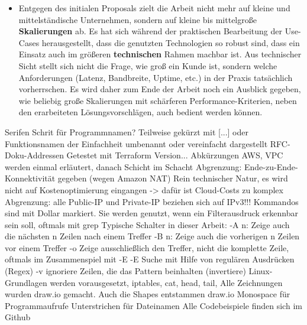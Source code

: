 \begin{itemize}
\item Entgegen des initialen Proposals zielt die Arbeit nicht mehr auf kleine und mittelständische Unternehmen, sondern auf kleine bis mittelgroße \textbf{Skalierungen} ab. Es hat sich während der praktischen Bearbeitung der Use-Cases herausgestellt, dass die genutzten Technologien so robust sind, dass ein Einsatz auch im \glqq größeren \textbf{technischen} Rahmen\grqq{} machbar ist. Aus technischer Sicht stellt sich nicht die Frage, wie \glqq groß\grqq{} ein Kunde ist, sondern welche Anforderungen (Latenz, Bandbreite, Uptime, etc.) in der Praxis tatsächlich vorherrschen. Es wird daher zum Ende der Arbeit noch ein Ausblick gegeben, wie beliebig große Skalierungen mit schärferen Performance-Kriterien, neben den erarbeiteten Lösungsvorschlägen, auch bedient werden können. 


\end{itemize}

\ifFalse
Serifen Schrit für Programmnamen?
Teilweise gekürzt mit [...] oder Funktionsnamen der Einfachheit umbenannt oder vereinfacht dargestellt
RFC-Doku-Addressen
Getestet mit Terraform Version...
Abkürzungen AWS, VPC werden einmal erläutert, danach Schicht im Schacht
Abgrenzung: Ende-zu-Ende-Konnektivität gegeben (wegen Amazon NAT)
Rein technischer Natur, es wird nicht auf Kostenoptimierung eingangen -> dafür ist Cloud-Costs zu komplex
Abgrenzung: alle Public-IP und Private-IP beziehen sich auf IPv3!!!
Kommandos sind mit Dollar markiert. Sie werden genutzt, wenn ein Filterausdruck erkennbar sein soll, oftmals mit grep
Typische Schalter in dieser Arbeit:
-A n: Zeige auch die nächsten n Zeilen nach einem Treffer
-B n: Zeige auch die vorherigen n Zeilen vor einem Treffer
-o Zeige ausschließlich den Treffer, nicht die komplette Zeile, oftmals im Zusammenspiel mit -E
-E Suche mit Hilfe von regulären Ausdrücken (Regex)
-v ignoriere Zeilen, die das Pattern beinhalten (invertiere)
Linux-Grundlagen werden vorausgesetzt, iptables, cat, head, tail, 
Alle Zeichnungen wurden draw.io gemacht. Auch die Shapes entstammen draw.io
Monospace für Programmaufrufe
Unterstrichen für Dateinamen
Alle Codebeispiele finden sich im Github
\fi